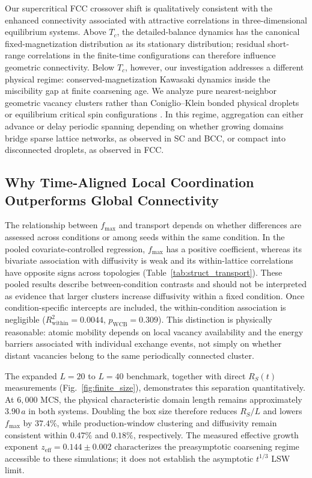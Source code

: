 \documentclass[aps,pre,reprint,superscriptaddress,amsmath,amssymb,floatfix]{revtex4-2}
\begin{document}
Our supercritical FCC crossover shift is qualitatively consistent with the enhanced connectivity associated with attractive correlations in three-dimensional equilibrium systems. Above $T_c$, the detailed-balance dynamics has the canonical fixed-magnetization distribution as its stationary distribution; residual short-range correlations in the finite-time configurations can therefore influence geometric connectivity. Below $T_c$, however, our investigation addresses a different physical regime: conserved-magnetization Kawasaki dynamics inside the miscibility gap at finite coarsening age. We analyze pure nearest-neighbor geometric vacancy clusters rather than Coniglio--Klein bonded physical droplets \cite{Coniglio1980,DOnorioDeMeo1990} or equilibrium critical spin configurations \cite{Zhu2026}. In this regime, aggregation can either advance or delay periodic spanning depending on whether growing domains bridge sparse lattice networks, as observed in SC and BCC, or compact into disconnected droplets, as observed in FCC.

\subsection{Why Time-Aligned Local Coordination Outperforms Global Connectivity}
\label{sec:morphology_vs_transport}

The relationship between $f_{\max}$ and transport depends on whether differences are assessed across conditions or among seeds within the same condition. In the pooled covariate-controlled regression, $f_{\max}$ has a positive coefficient, whereas its bivariate association with diffusivity is weak and its within-lattice correlations have opposite signs across topologies (Table~\ref{tab:struct_transport}). These pooled results describe between-condition contrasts and should not be interpreted as evidence that larger clusters increase diffusivity within a fixed condition. Once condition-specific intercepts are included, the within-condition association is negligible ($R^2_{\mathrm{within}}=0.0044$, $p_{\mathrm{WCB}}=0.309$). This distinction is physically reasonable: atomic mobility depends on local vacancy availability and the energy barriers associated with individual exchange events, not simply on whether distant vacancies belong to the same periodically connected cluster.

The expanded $L=20$ to $L=40$ benchmark, together with direct $R_S(t)$ measurements (Fig.~\ref{fig:finite_size}), demonstrates this separation quantitatively. At $6{,}000$ MCS, the physical characteristic domain length remains approximately $3.90\,a$ in both systems. Doubling the box size therefore reduces $R_S/L$ and lowers $f_{\max}$ by $37.4\%$, while production-window clustering and diffusivity remain consistent within $0.47\%$ and $0.18\%$, respectively. The measured effective growth exponent $z_{\mathrm{eff}}=0.144\pm0.002$ characterizes the preasymptotic coarsening regime accessible to these simulations; it does not establish the asymptotic $t^{1/3}$ LSW limit.
\end{document}
